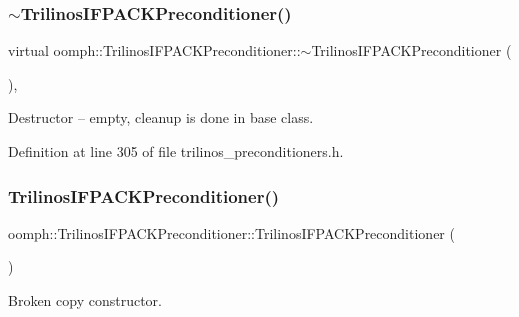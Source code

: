 \subsubsection{\texorpdfstring{$\sim$\+Trilinos\+I\+F\+P\+A\+C\+K\+Preconditioner()}{~TrilinosIFPACKPreconditioner()}}
{\footnotesize\ttfamily virtual oomph\+::\+Trilinos\+I\+F\+P\+A\+C\+K\+Preconditioner\+::$\sim$\+Trilinos\+I\+F\+P\+A\+C\+K\+Preconditioner (\begin{DoxyParamCaption}{ }\end{DoxyParamCaption})\hspace{0.3cm}{\ttfamily [inline]}, {\ttfamily [virtual]}}



Destructor -- empty, cleanup is done in base class. 



Definition at line 305 of file trilinos\+\_\+preconditioners.\+h.

\mbox{\label{classoomph_1_1TrilinosIFPACKPreconditioner_af8f36f8121b2c0eadf6791844f4c21fc}} 
\subsubsection{\texorpdfstring{Trilinos\+I\+F\+P\+A\+C\+K\+Preconditioner()}{TrilinosIFPACKPreconditioner()}\hspace{0.1cm}{\footnotesize\ttfamily [2/2]}}
{\footnotesize\ttfamily oomph\+::\+Trilinos\+I\+F\+P\+A\+C\+K\+Preconditioner\+::\+Trilinos\+I\+F\+P\+A\+C\+K\+Preconditioner (\begin{DoxyParamCaption}\item[{const \hyperlink{classoomph_1_1TrilinosIFPACKPreconditioner}{Trilinos\+I\+F\+P\+A\+C\+K\+Preconditioner} \&}]{ }\end{DoxyParamCaption})\hspace{0.3cm}{\ttfamily [inline]}}



Broken copy constructor. 



